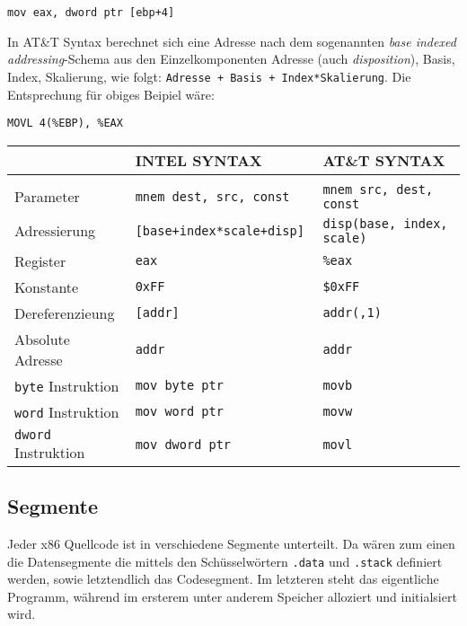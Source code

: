 \texttt{mov eax, dword ptr [ebp+4]}

In AT\&T Syntax berechnet sich eine Adresse nach dem sogenannten \emph{base indexed addressing}-Schema aus den Einzelkomponenten
Adresse (auch \emph{disposition}), Basis, Index, Skalierung, wie folgt: \texttt{Adresse + Basis + Index*Skalierung}. Die Entsprechung für obiges Beipiel wäre:

\texttt{MOVL 4(\%EBP), \%EAX}

\begin{tabular}{lll}
\\	   & INTEL SYNTAX                &        AT\&T SYNTAX
\\\hline
\\	Parameter 								& \tt mnem dest, src, const  	  & \tt mnem src, dest, const
\\Adressierung  				   	&	\tt [base+index*scale+disp]  & \tt disp(base, index, scale)
\\	Register      						& \tt eax              					& \tt \%eax
\\	Konstante     						& \tt 0xFF             					& \tt \$0xFF
\\	Dereferenzieung   				& \tt [addr]           					& \tt addr(,1)
\\	Absolute Adresse 				& \tt addr             					& \tt *addr
\\	{\tt byte} Instruktion   & \tt mov byte ptr     					& \tt movb
\\	{\tt word} Instruktion   & \tt mov word ptr     					& \tt movw
\\{\tt dword} Instruktion  & \tt mov dword ptr    					& \tt movl
\end{tabular}



\subsection{Segmente} Jeder x86 Quellcode ist in verschiedene Segmente
unterteilt. Da wären zum einen die Datensegmente die mittels den
Schüsselwörtern \texttt{.data} und \texttt{.stack} definiert werden, sowie
letztendlich das Codesegment. Im letzteren steht das eigentliche Programm,
während im ersterem unter anderem Speicher alloziert und initialsiert wird.
